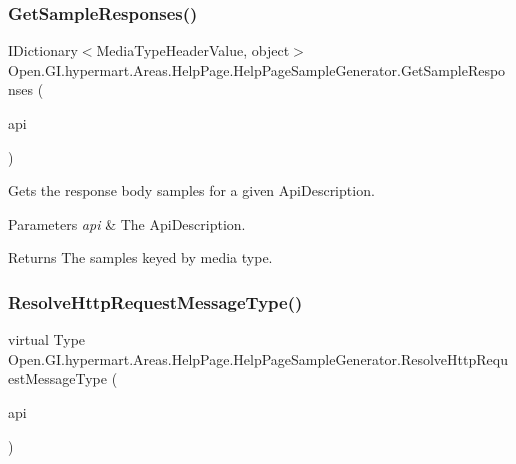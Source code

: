 \subsubsection{\texorpdfstring{Get\+Sample\+Responses()}{GetSampleResponses()}}
{\footnotesize\ttfamily I\+Dictionary$<$Media\+Type\+Header\+Value, object$>$ Open.\+G\+I.\+hypermart.\+Areas.\+Help\+Page.\+Help\+Page\+Sample\+Generator.\+Get\+Sample\+Responses (\begin{DoxyParamCaption}\item[{Api\+Description}]{api }\end{DoxyParamCaption})}



Gets the response body samples for a given Api\+Description. 


\begin{DoxyParams}{Parameters}
{\em api} & The Api\+Description.\\
\hline
\end{DoxyParams}
\begin{DoxyReturn}{Returns}
The samples keyed by media type.
\end{DoxyReturn}
\hypertarget{class_open_1_1_g_i_1_1hypermart_1_1_areas_1_1_help_page_1_1_help_page_sample_generator_a64f0926946de3989be80507e6189fdc8}{}\label{class_open_1_1_g_i_1_1hypermart_1_1_areas_1_1_help_page_1_1_help_page_sample_generator_a64f0926946de3989be80507e6189fdc8} 
\subsubsection{\texorpdfstring{Resolve\+Http\+Request\+Message\+Type()}{ResolveHttpRequestMessageType()}}
{\footnotesize\ttfamily virtual Type Open.\+G\+I.\+hypermart.\+Areas.\+Help\+Page.\+Help\+Page\+Sample\+Generator.\+Resolve\+Http\+Request\+Message\+Type (\begin{DoxyParamCaption}\item[{Api\+Description}]{api }\end{DoxyParamCaption})\hspace{0.3cm}{\ttfamily [virtual]}}



